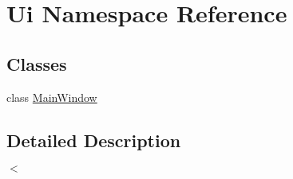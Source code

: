 \hypertarget{namespace_ui}{\section{Ui Namespace Reference}
\label{namespace_ui}
}
\subsection*{Classes}
\begin{DoxyCompactItemize}
\item 
class \hyperlink{class_ui_1_1_main_window}{Main\-Window}
\end{DoxyCompactItemize}


\subsection{Detailed Description}
$<$ 
\begin{DoxyCodeInclude}
\end{DoxyCodeInclude}
 
